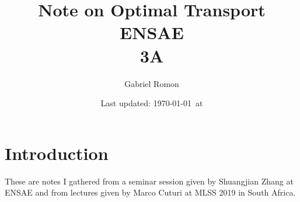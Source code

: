 \documentclass{article}
\title{Note on Optimal Transport\\ ENSAE\\ 3A}
\author{Gabriel Romon}
\date{Last updated: \today \, at \currenttime}
\theoremstyle{definition}
\theoremstyle{remark}
\begin{document}
\maketitle

\section{Introduction}

These are notes I gathered from a seminar session given by Shuangjian Zhang at ENSAE and from lectures given by Marco Cuturi at MLSS 2019 in South Africa. 
\end{document}
